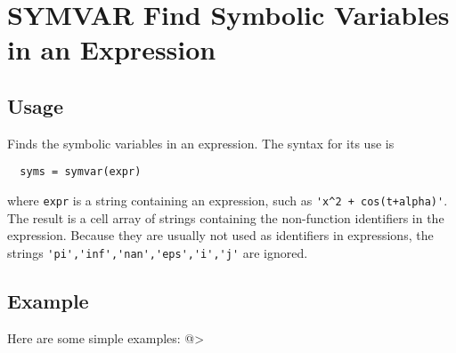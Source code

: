 \section{SYMVAR Find Symbolic Variables in an Expression}

\subsection{Usage}

Finds the symbolic variables in an expression.  The syntax for its
use is 
\begin{verbatim}
  syms = symvar(expr)
\end{verbatim}
where \verb|expr| is a string containing an expression, such as
\verb|'x^2 + cos(t+alpha)'|.  The result is a cell array of strings
containing the non-function identifiers in the expression.  Because
they are usually not used as identifiers in expressions, the strings
 \verb|'pi','inf','nan','eps','i','j'| are ignored.
\subsection{Example}

Here are some simple examples:
@>
